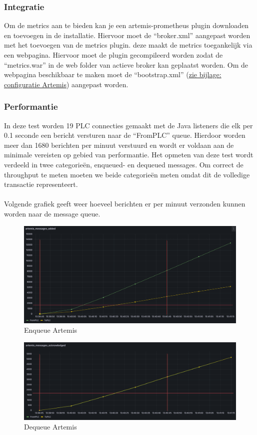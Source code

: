 \subsubsection{Integratie}
Om de metrics aan te bieden kan je een artemis-prometheus plugin downloaden en toevoegen in de installatie.
Hiervoor moet de ``broker.xml'' aangepast worden met het toevoegen van de metrics plugin.
deze maakt de metrics toegankelijk via een webpagina.
Hiervoor moet de plugin gecompileerd worden zodat de ``metrics.war'' in de web folder van actieve broker kan geplaatst worden.
Om de webpagina beschikbaar te maken moet de ``bootstrap.xml'' (\hyperref[listing:bootstrap_artemis]{zie bijlage: configuratie Artemis}) aangepast worden.

\subsubsection{Performantie}
In deze test worden 19 PLC connecties gemaakt met de Java listeners die elk per 0.1 seconde een bericht versturen naar de ``FromPLC'' queue.
Hierdoor worden meer dan 1680 berichten per minuut verstuurd en wordt er voldaan aan de minimale vereisten op gebied van performantie.
Het opmeten van deze test wordt verdeeld in twee categorieën, enqueued- en dequeued messages.
Om correct de throughput te meten moeten we beide categorieën meten omdat dit de volledige transactie representeert. 
\\\\
Volgende grafiek geeft weer hoeveel berichten er per minuut verzonden kunnen worden naar de message queue.
\begin{figure}[h!]
  \centering
  \includegraphics[width=.95\textwidth]{img/artemis-enqueue-count.png}
  \caption{\label{fig:artemis_enqueue_count}Enqueue Artemis}
\end{figure}

\begin{figure}[h!]
  \centering
  \includegraphics[width=.95\textwidth]{img/artemis-dequeue-count.png}
  \caption{\label{fig:artemis_dequeue_count}Dequeue Artemis}
\end{figure}

